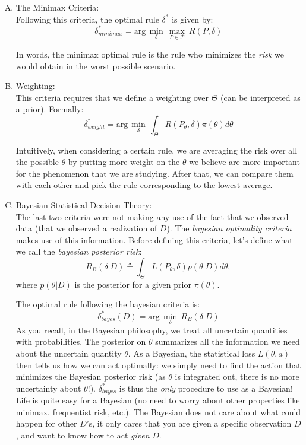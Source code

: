 \documentclass[12pt]{report}
\renewcommand{\emph}[1]{\color{violet}#1\color{black}{}}
\begin{document}
\begin{enumerate}[A)]
\item \emph{The Minimax Criteria}:\\
Following this criteria, the optimal rule $\delta^*$ is given by:
$$\delta^*_{minimax}=\text{arg}\,\min\limits_{\delta}\,\max\limits_{P \in \mathcal{P}}\ R(P,\delta)$$

In words, the minimax optimal rule is the rule who minimizes the \textit{risk} we would obtain in the worst possible scenario.

\item \emph{Weighting}:\\
This criteria requires that we define a \emph{weighting} over $\Theta$ (can be interpreted as a prior). Formally:
$$\delta^*_{weight}= \text{arg}\,\min\limits_{\delta}\,\int_{\Theta}^{}R(P_\theta,\delta)\pi(\theta)d\theta$$

Intuitively, when considering a certain rule, we are averaging the risk over all the possible $\theta$ by putting more weight on the $\theta$ we believe are more important for the phenomenon that we are studying. After that, we can compare them with each other and pick the rule corresponding to the lowest average.

\item \emph{Bayesian Statistical Decision Theory}:\\
The last two criteria were not making any use of the fact that we observed data (that we observed a realization of $D$). The \textit{bayesian optimality criteria} makes use of this information. Before defining this criteria, let's define what we call the \textit{bayesian posterior risk}:
$$R_B(\delta|D) \triangleq \int_{\Theta}^{}L(P_{\theta},\delta)p(\theta|D)d\theta,$$
where $p(\theta|D)$ is the posterior for a given prior $\pi(\theta)$.

The optimal rule following the bayesian criteria is:
$$\delta_{bayes}^{*}(D)= \text{arg}\,\min\limits_{\delta}\,R_B(\delta|D)$$
As you recall, in the Bayesian philosophy, we treat all uncertain quantities with probabilities. The posterior on $\theta$ summarizes all the information we need about the uncertain quantity $\theta$. As a Bayesian, the statistical loss $L(\theta,a)$ then tells us how we can \emph{act optimally}: we simply need to find the action that minimizes the Bayesian posterior risk (as $\theta$ is integrated out, there is no more uncertainty about $\theta$!). $\delta_{bayes}^{*}$ is thus the \textit{only} procedure to use as a Bayesian! Life is quite easy for a Bayesian (no need to worry about other properties like minimax, frequentist risk, etc.). The Bayesian does not care about what could happen for other $D$'s, it only cares that you are given a specific observation $D$, and want to know how to act \textit{given} $D$.


\end{enumerate}
\end{document}
